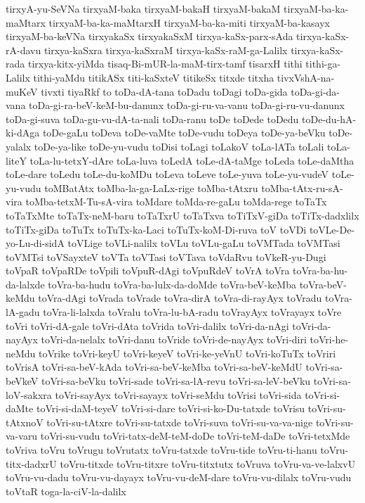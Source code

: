 {tirxyA-yu-SeVNa
tirxyaM-baka
tirxyaM-bakaH
tirxyaM-bakaM
tirxyaM-ba-ka-maMtarx
tirxyaM-ba-ka-maMtarxH
tirxyaM-ba-ka-miti
tirxyaM-ba-kasayx
tirxyaM-ba-keVNa
tirxyakaSx
tirxyakaSxM
tirxya-kaSx-parx-sAda
tirxya-kaSx-rA-davu
tirxya-kaSxra
tirxya-kaSxraM
tirxya-kaSx-raM-ga-Lalilx
tirxya-kaSx-rada
tirxya-kitx-yiMda
tisaq-Bi-mUR-la-maM-tirx-tamf
tisarxH
tithi
tithi-ga-Lalilx
tithi-yaMdu
titikASx
titi-kaSxteV
titikeSx
titxde
titxha
tivxVshA-na-muKeV
tivxti
tiyaRkf
to
toDa-dA-tana
toDadu
toDagi
toDa-gida
toDa-gi-da-vana
toDa-gi-ra-beV-keM-bu-danunx
toDa-gi-ru-va-vanu
toDa-gi-ru-vu-danunx
toDa-gi-suva
toDa-gu-vu-dA-ta-nali
toDa-ranu
toDe
toDede
toDedu
toDe-du-hA-ki-dAga
toDe-gaLu
toDeva
toDe-vaMte
toDe-vudu
toDeya
toDe-ya-beVku
toDe-yalalx
toDe-ya-like
toDe-yu-vudu
toDisi
toLagi
toLakoV
toLa-lATa
toLali
toLa-liteY
toLa-lu-tetxY-dAre
toLa-luva
toLedA
toLe-dA-taMge
toLeda
toLe-daMtha
toLe-dare
toLedu
toLe-du-koMDu
toLeva
toLeve
toLe-yuva
toLe-yu-vudeV
toLe-yu-vudu
toMBatAtx
toMba-la-ga-LaLx-rige
toMba-tAtxru
toMba-tAtx-ru-sA-vira
toMba-tetxM-Tu-sA-vira
toMdare
toMda-re-gaLu
toMda-rege
toTaTx
toTaTxMte
toTaTx-neM-baru
toTaTxrU
toTaTxva
toTiTxV-giDa
toTiTx-dadxlilx
toTiTx-giDa
toTuTx
toTuTx-ka-Laci
toTuTx-koM-Di-ruva
toV
toVDi
toVLe-De-yo-Lu-di-sidA
toVLige
toVLi-nalilx
toVLu
toVLu-gaLu
toVMTada
toVMTasi
toVMTsi
toVSayxteV
toVTa
toVTasi
toVTava
toVdaRvu
toVkeR-yu-Dugi
toVpaR
toVpaRDe
toVpili
toVpuR-dAgi
toVpuRdeV
toVrA
toVra
toVra-ba-hu-da-lalxde
toVra-ba-hudu
toVra-ba-lulx-da-doMde
toVra-beV-keMba
toVra-beV-keMdu
toVra-dAgi
toVrada
toVrade
toVra-dirA
toVra-di-rayAyx
toVradu
toVra-lA-gadu
toVra-li-lalxda
toVralu
toVra-lu-bA-radu
toVrayAyx
toVrayayx
toVre
toVri
toVri-dA-gale
toVri-dAta
toVrida
toVri-dalilx
toVri-da-nAgi
toVri-da-nayAyx
toVri-da-nelalx
toVri-danu
toVride
toVri-de-nayAyx
toVri-diri
toVri-he-neMdu
toVrike
toVri-keyU
toVri-keyeV
toVri-ke-yeVnU
toVri-koTuTx
toVriri
toVrisA
toVri-sa-beV-kAda
toVri-sa-beV-keMba
toVri-sa-beV-keMdU
toVri-sa-beVkeV
toVri-sa-beVku
toVri-sade
toVri-sa-lA-revu
toVri-sa-leV-beVku
toVri-sa-loV-sakxra
toVri-sayAyx
toVri-sayayx
toVri-seMdu
toVrisi
toVri-sida
toVri-si-daMte
toVri-si-daM-teyeV
toVri-si-dare
toVri-si-ko-Du-tatxde
toVrisu
toVri-su-tAtxnoV
toVri-su-tAtxre
toVri-su-tatxde
toVri-suva
toVri-su-va-va-nige
toVri-su-va-varu
toVri-su-vudu
toVri-tatx-deM-teM-doDe
toVri-teM-daDe
toVri-tetxMde
toVriva
toVru
toVrugu
toVrutatx
toVru-tatxde
toVru-tide
toVru-ti-hanu
toVru-titx-dadxrU
toVru-titxde
toVru-titxre
toVru-titxtutx
toVruva
toVru-va-ve-lalxvU
toVru-vu-dadu
toVru-vu-dayayx
toVru-vu-deM-dare
toVru-vu-dilalx
toVru-vudu
toVtaR
toga-la-ciV-la-dalilx
}
